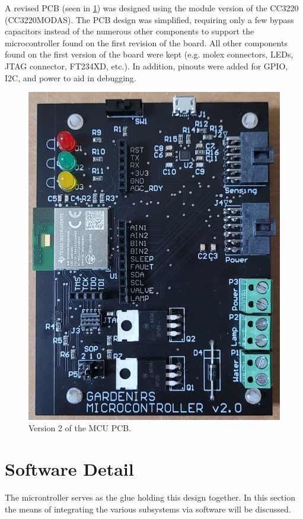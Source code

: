 \documentclass[journal]{IEEEtran}
\begin{document}
A revised PCB (seen in \ref{fig:mcu_pcb_v2}) was designed using the module version of the CC3220 (CC3220MODAS). The PCB design was simplified, requiring only a few bypass capacitors instead of the numerous other components to support the microcontroller found on the first revision of the board. All other components found on the first version of the board were kept (e.g. molex connectors, LEDs, JTAG connector, FT234XD, etc.). In addition, pinouts were added for GPIO, I2C, and power to aid in debugging.

\begin{figure}[H]
   \centering
   \label{fig:mcu_pcb_v2}
   \includegraphics[width=\linewidth]{images/mcu_pcb_v2.jpg}
   \caption{Version 2 of the MCU PCB.}
\end{figure}

\section{Software Detail}
The microntroller serves as the glue holding this design together. In this section the means of
integrating the various subsystems via software will be discussed.
\end{document}
